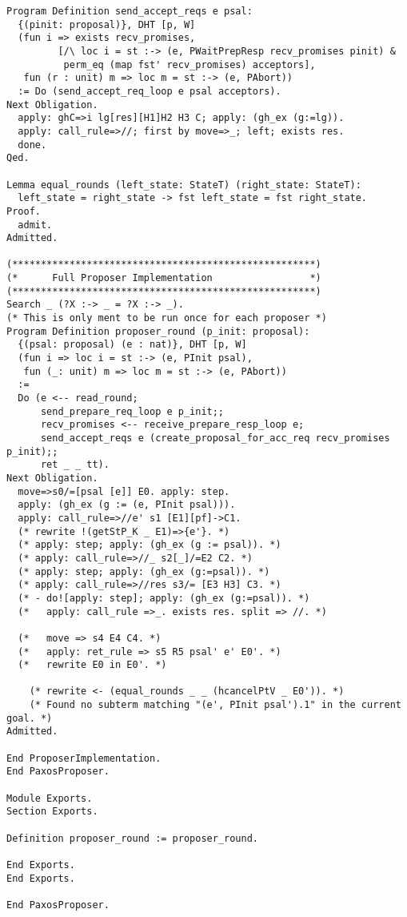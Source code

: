 \begin{landscape}
\begin{multicols*}{2}
\begin{lstlisting}[style=SourceCodeListing]
Program Definition send_accept_reqs e psal:
  {(pinit: proposal)}, DHT [p, W]
  (fun i => exists recv_promises,
         [/\ loc i = st :-> (e, PWaitPrepResp recv_promises pinit) &
          perm_eq (map fst' recv_promises) acceptors],
   fun (r : unit) m => loc m = st :-> (e, PAbort))
  := Do (send_accept_req_loop e psal acceptors).
Next Obligation.
  apply: ghC=>i lg[res][H1]H2 H3 C; apply: (gh_ex (g:=lg)).
  apply: call_rule=>//; first by move=>_; left; exists res.
  done.
Qed.

Lemma equal_rounds (left_state: StateT) (right_state: StateT):
  left_state = right_state -> fst left_state = fst right_state.
Proof.
  admit.
Admitted.

(*****************************************************)
(*      Full Proposer Implementation                 *)
(*****************************************************)
Search _ (?X :-> _ = ?X :-> _).
(* This is only ment to be run once for each proposer *)
Program Definition proposer_round (p_init: proposal):
  {(psal: proposal) (e : nat)}, DHT [p, W]
  (fun i => loc i = st :-> (e, PInit psal),
   fun (_: unit) m => loc m = st :-> (e, PAbort))
  :=
  Do (e <-- read_round;
      send_prepare_req_loop e p_init;;
      recv_promises <-- receive_prepare_resp_loop e;
      send_accept_reqs e (create_proposal_for_acc_req recv_promises p_init);;
      ret _ _ tt).
Next Obligation.
  move=>s0/=[psal [e]] E0. apply: step.
  apply: (gh_ex (g := (e, PInit psal))).
  apply: call_rule=>//e' s1 [E1][pf]->C1.
  (* rewrite !(getStP_K _ E1)=>{e'}. *)
  (* apply: step; apply: (gh_ex (g := psal)). *)
  (* apply: call_rule=>//_ s2[_]/=E2 C2. *)
  (* apply: step; apply: (gh_ex (g:=psal)). *)
  (* apply: call_rule=>//res s3/= [E3 H3] C3. *)
  (* - do![apply: step]; apply: (gh_ex (g:=psal)). *)
  (*   apply: call_rule =>_. exists res. split => //. *)

  (*   move => s4 E4 C4. *)
  (*   apply: ret_rule => s5 R5 psal' e' E0'. *)
  (*   rewrite E0 in E0'. *)

    (* rewrite <- (equal_rounds _ _ (hcancelPtV _ E0')). *)
    (* Found no subterm matching "(e', PInit psal').1" in the current goal. *)
Admitted.

End ProposerImplementation.
End PaxosProposer.

Module Exports.
Section Exports.

Definition proposer_round := proposer_round.

End Exports.
End Exports.

End PaxosProposer.


\end{lstlisting}
\end{multicols*}
\end{landscape}
